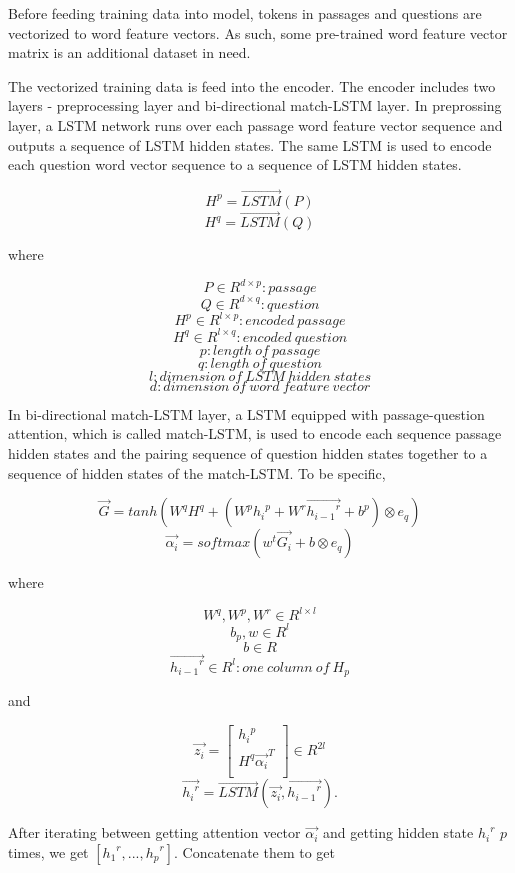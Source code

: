 \documentclass[modernstyle,12pt]{sjsuthesis}
\theoremstyle{definition}
\begin{document}
Before feeding training data into model, tokens in passages and questions are vectorized to word feature vectors. As such, some pre-trained word feature vector matrix is an additional dataset in need.

The vectorized training data is feed into the encoder. The encoder includes two layers - preprocessing layer and bi-directional match-LSTM layer. In preprossing layer, a LSTM network runs over each passage word feature vector sequence and outputs a sequence of LSTM hidden states. The same LSTM is used to encode each question word vector sequence to a sequence of LSTM hidden states.

$$H^p = \overrightarrow{LSTM}(P)$$
$$H^q = \overrightarrow{LSTM}(Q)$$

where

 $$P\in R^{d \times p}: passage$$
 $$Q\in R^{d \times q}: question$$
 $$H^p\in R^{l \times p}: encoded\ passage$$
 $$H^q\in R^{l \times q}: encoded\ question$$
 $$p: length \ of\ passage$$
 $$q: length\ of\ question$$
 $$l: dimension\ of\ LSTM\ hidden\ states$$
 $$d: dimension\ of\ word\ feature\ vector$$

In bi-directional match-LSTM layer, a LSTM equipped with passage-question attention, which is called match-LSTM, is used to encode each sequence passage hidden states and the pairing sequence of question hidden states together to a sequence of hidden states of the match-LSTM. To be specific,

$$\overrightarrow{G} = tanh(W^qH^q + (W^p{h_i}^p + W^r\overrightarrow{{h_{i-1}}^r} + b^p) \otimes e_q)$$
$$\overrightarrow{\alpha _i} = softmax(w^t\overrightarrow{G_i} + b \otimes e_q)$$


where

$$W^q, W^p, W^r\in R^{l \times l} $$
$$b_p, w\in R^{l}  $$
$$b \in R $$
$$\overrightarrow{{h_{i-1}}^r}\in R^{l}: one\ column\ of\ H_p  $$

and

\[ \overrightarrow{z_i} =
\begin{bmatrix}
{h_i}^p \\
H^q\overrightarrow{ {\alpha _i}}^T \\
\end{bmatrix}
\in R^{2l}
\]
$$\overrightarrow{{h_i}^r} = \overrightarrow{LSTM}(\overrightarrow{z_i}, \overrightarrow{{h_{i-1}}^r}).$$

After iterating between getting attention vector $\overrightarrow{\alpha _i}$ and getting hidden state ${{h_{i}}^r}$ $p$ times, we get $[{{h_{1}}^r}, ..., {{h_{p}}^r}]$. Concatenate them to get
\end{document}
